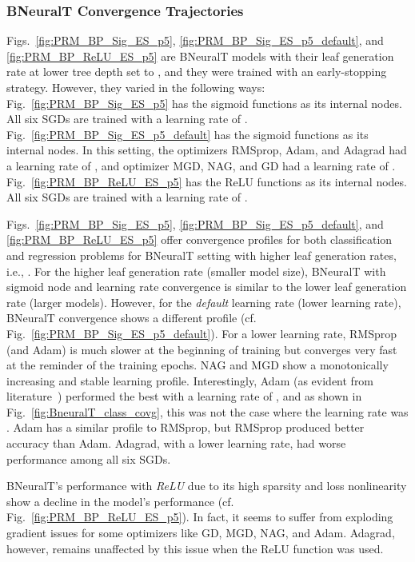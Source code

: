 \documentclass[11pt,a4paper]{article}
\begin{document}
\subsubsection{BNeuralT Convergence Trajectories}
    Figs.~\ref{fig:PRM_BP_Sig_ES_p5}, 
    \ref{fig:PRM_BP_Sig_ES_p5_default}, and
    \ref{fig:PRM_BP_ReLU_ES_p5}
    are BNeuralT models with their leaf generation rate at lower tree depth set to , and they were trained with an early-stopping strategy. However, they varied in the following ways:
Fig.~\ref{fig:PRM_BP_Sig_ES_p5} has the sigmoid functions as its internal nodes. All six SGDs are trained with a learning rate of . 
Fig.~\ref{fig:PRM_BP_Sig_ES_p5_default} has the sigmoid functions as its internal nodes. In this setting, the optimizers RMSprop, Adam, and Adagrad had a learning rate of , and optimizer MGD, NAG, and GD  had a learning rate of .
Fig.~\ref{fig:PRM_BP_ReLU_ES_p5} has the ReLU functions as its internal nodes. All six SGDs are trained with a learning rate of . 
    
    Figs.~\ref{fig:PRM_BP_Sig_ES_p5}, \ref{fig:PRM_BP_Sig_ES_p5_default}, and
    \ref{fig:PRM_BP_ReLU_ES_p5} 
offer convergence profiles for both classification and regression problems for BNeuralT setting with higher leaf generation rates, i.e., . For the higher leaf generation rate (smaller model size), BNeuralT with sigmoid node and  learning rate convergence is similar to the lower leaf generation rate (larger models). However, for the \textit{default} learning rate (lower learning rate), BNeuralT convergence shows a different profile (cf.  Fig.~\ref{fig:PRM_BP_Sig_ES_p5_default}). For a lower learning rate, RMSprop (and Adam) is much slower at the beginning of training but converges very fast at the reminder of the training epochs. NAG and MGD show a monotonically increasing and stable learning profile. Interestingly, Adam (as evident from literature~\citep{diederik2015adam}) performed the best with a learning rate of ,  and as shown in Fig.~\ref{fig:BneuralT_class_covg}, this was not the case where the learning rate was . Adam has a similar profile to RMSprop, but RMSprop produced better accuracy than Adam. Adagrad, with a lower learning rate, had worse performance among  all six SGDs.  
    
    BNeuralT's performance with \textit{ReLU} due to its high sparsity and loss nonlinearity show a decline in the model's performance (cf. Fig.~\ref{fig:PRM_BP_ReLU_ES_p5}). In fact, it seems to suffer from exploding gradient issues for some optimizers like GD, MGD, NAG, and Adam. Adagrad, however, remains unaffected by this issue when the ReLU function was used.
    
\end{document}
